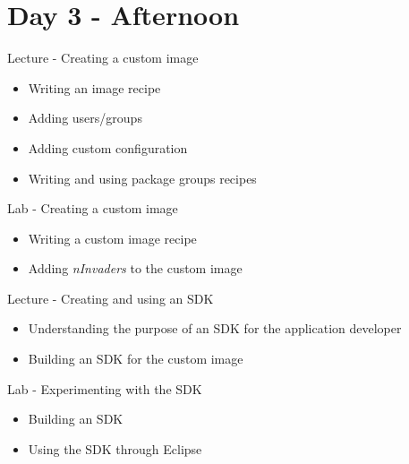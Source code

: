 \documentclass[a4paper,12pt,obeyspaces,spaces,hyphens]{article}
\begin{document}
\section{Day 3 - Afternoon}

\feagendatwocolumn
{Lecture - Creating a custom image}
{
  \begin{itemize}
  \item Writing an image recipe
  \item Adding users/groups
  \item Adding custom configuration
  \item Writing and using package groups recipes
  \end{itemize}
}
{Lab - Creating a custom image}
{
  \begin{itemize}
  \item Writing a custom image recipe
  \item Adding {\em nInvaders} to the custom image
  \end{itemize}
}
\feagendatwocolumn
{Lecture - Creating and using an SDK}
{
  \begin{itemize}
  \item Understanding the purpose of an SDK for the application
    developer
  \item Building an SDK for the custom image
  \end{itemize}
}
{Lab - Experimenting with the SDK}
{
  \begin{itemize}
  \item Building an SDK
  \item Using the SDK through Eclipse
  \end{itemize}
}
\end{document}
